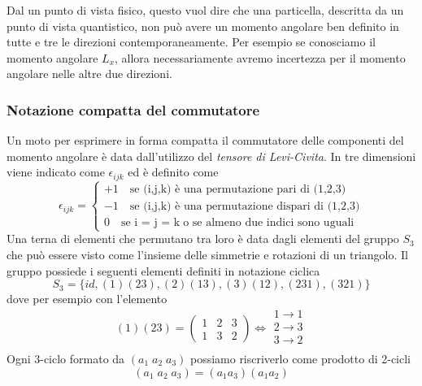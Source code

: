 Dal un punto di vista fisico, questo vuol dire che una particella, descritta da un punto di vista quantistico, non pu\`o avere un momento angolare ben definito in tutte e tre le direzioni contemporaneamente. Per esempio se conosciamo il momento angolare $L_x$, allora necessariamente avremo incertezza per il momento angolare nelle altre due direzioni.

\subsubsection{Notazione compatta del commutatore}

Un moto per esprimere in forma compatta il commutatore delle componenti del momento angolare \`e data dall'utilizzo del \textit{tensore di Levi-Civita}. In tre dimensioni viene indicato come  $\epsilon_{ijk}$ ed \`e definito come
\begin{equation*}
	\epsilon_{ijk} = \left \{ \begin{array}{l}
		+ 1 \quad \text{se (i,j,k) \`e una permutazione pari di (1,2,3)}\\
		-1 \quad \text{se (i,j,k) \`e una permutazione dispari di (1,2,3)}\\
		0 \quad \text{se i = j = k} \; \text{o se almeno due indici sono uguali}
	\end{array}\right.
\end{equation*}
Una terna di elementi che permutano tra loro \`e data dagli elementi del gruppo $S_3$ che pu\`o essere visto come l'insieme delle simmetrie e rotazioni di un triangolo. Il gruppo possiede i seguenti elementi definiti in notazione ciclica
\begin{equation*}
	S_3 = \big \{ id,(1)(23),(2)(13),(3)(12),(231),(321)\big \} 
\end{equation*}
dove per esempio con l'elemento 
\begin{equation*}
	(1)(23) = \left ( \begin{array}{ccc}
		1 & 2 & 3 \\
		1 & 3 & 2
	\end{array}\right ) 
	\iff 
	\begin{array}{l}
		1 \to 1 \\
		2 \to 3 \\ 
		3 \to 2 \\
	\end{array}
\end{equation*}
Ogni 3-ciclo formato da $(a_1 \; a_2 \; a_3)$ possiamo riscriverlo come prodotto di 2-cicli
\begin{equation*}
	(a_1 \; a_2 \; a_3) = (a_1a_3)(a_1a_2)
\end{equation*}

